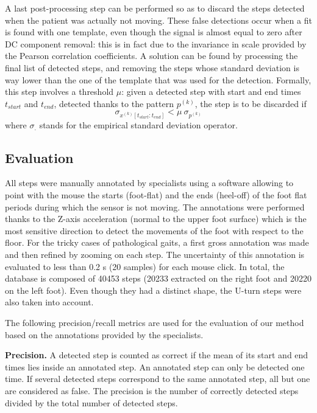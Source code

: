 \documentclass[../thesis.tex]{subfiles}
\begin{document}
A last  post-processing step can be performed so as to discard the steps detected when the patient was actually not moving. These false detections occur when a fit is  found with one template, even though the signal is almost equal to zero after DC component removal: this is in fact due to the invariance in scale provided by the Pearson correlation coefficients. A solution can be found by processing the final list of detected steps, and removing the steps whose standard deviation is way lower than the one of the template that was used for the detection. Formally, this step involves a threshold $\mu$: given a detected step with start and end times $t_{start}$ and $t_{end}$, detected thanks to the pattern $p^{(k)}$, the step is to be discarded if
\begin{equation}
 \sigma_{x^{(k)}[t_{start} : t_{end}]} < \mu\  \sigma_{p^{(k)}}
\end{equation}
where $\sigma_{.}$ stands for the empirical standard deviation operator.



\subsection{Evaluation}
\label{sec:walk_sd:eval}


All steps were manually annotated by specialists using a software allowing to point with the mouse the starts (foot-flat) and the ends (heel-off) of the foot flat periods during which the sensor is not moving.  The annotations were performed thanks to the Z-axis acceleration (normal to the upper foot surface) which is the most sensitive direction to detect the movements of the foot with respect to the floor. For the tricky cases of pathological gaits, a first gross annotation was made and then refined by zooming on each step. The uncertainty of this annotation is evaluated to less than 0.2 s (20 samples) for each mouse click. In total, the database is composed of 40453 steps (20233 extracted on the right foot and 20220 on the left foot). Even though they had a distinct shape, the U-turn steps were also taken into account.
 

The following precision/recall metrics are used for the evaluation of our method based on the annotations provided by the specialists.

\textbf{Precision.} A detected step is counted as correct if the mean of its start and end times lies inside an annotated step. An annotated step can only be detected one time. If several detected steps correspond to the same annotated step, all but one are considered as false. The precision is the number of correctly detected steps divided by the total number of detected steps.
\end{document}
